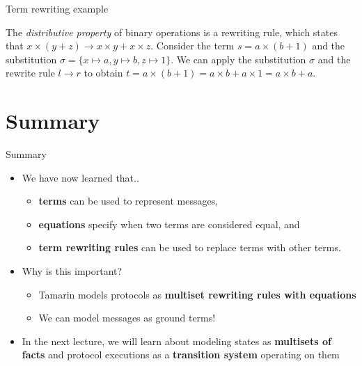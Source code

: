 \documentclass[11pt,aspectratio=169]{beamer}
\begin{document}
\begin{frame}[fragile]{Term rewriting example}
    \begin{tcolorbox}[title=Example]
        The \textit{distributive property} of binary operations is a rewriting 
        rule, which states that $x \times (y + z) \rightarrow x \times y + x 
        \times z$. Consider the term $s = a \times (b + 1)$ and the 
        substitution $\sigma = \{x \mapsto a, y \mapsto b, z \mapsto 1\}$. We 
        can apply the substitution $\sigma$ and the rewrite rule $l \rightarrow 
        r$ to obtain $t = a \times (b + 1) = a \times b + a \times 1 = a \times 
        b + a$.
    \end{tcolorbox}
\end{frame}


\section*{Summary}


\begin{frame}[fragile]{Summary}
    \begin{itemize}
        \item We have now learned that..
        \begin{itemize}
            \item \textbf{terms} can be used to represent messages,
            \item \textbf{equations} specify when two terms are considered 
                  equal, and
            \item \textbf{term rewriting rules} can be used to replace terms 
                  with other terms.
        \end{itemize}
        \item Why is this important?
        \begin{itemize}
            \item Tamarin models protocols as
                  \textbf{multiset rewriting rules with equations}
            \item We can model messages as ground terms!
        \end{itemize}
        \item In the next lecture, we will learn about modeling states as 
              \textbf{multisets of facts} and protocol executions as a
              \textbf{transition system} operating on them
    \end{itemize}
\end{frame}
\end{document}
